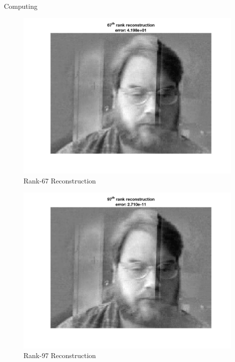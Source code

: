 \begin{section}{Computing}
{        \begin{figure}[H]
        \centering
        \includegraphics[trim={0cm 3.5cm 0cm 0cm},clip,width=0.6\columnwidth]{../data/rank_67_recon}
        \caption{Rank-67 Reconstruction}
        \label{fig:r67}
        \end{figure}

        \begin{figure}[H]
        \centering
        \includegraphics[trim={0cm 3.5cm 0cm 0cm},clip,width=0.6\columnwidth]{../data/rank_97_recon}
        \caption{Rank-97 Reconstruction}
        \label{fig:r97}
        \end{figure}
}

\end{section}
